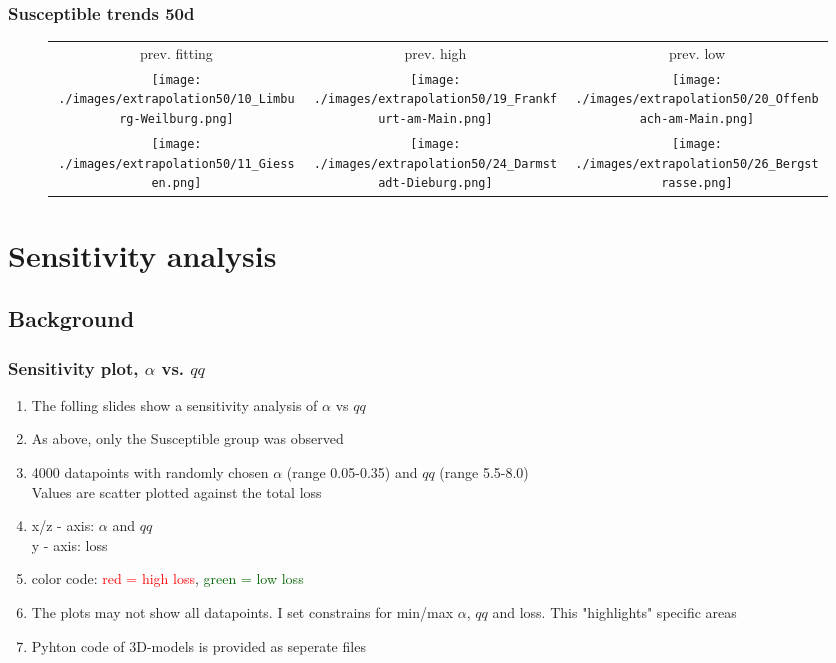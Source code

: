 \documentclass{beamer}
\begin{document}
\begin{frame}
	\frametitle{Susceptible trends 50d}
	\begin{center}
		\begin{figure}
			\begin{adjustwidth}{-0.8cm}{}
			\begin{tabular}{ccc}
				prev. fitting & prev. high & prev. low \\
				\texttt{[image: ./images/extrapolation50/10\_Limburg-Weilburg.png]}
					& \texttt{[image: ./images/extrapolation50/19\_Frankfurt-am-Main.png]}
					& \texttt{[image: ./images/extrapolation50/20\_Offenbach-am-Main.png]} \\
				\texttt{[image: ./images/extrapolation50/11\_Giessen.png]}
					& \texttt{[image: ./images/extrapolation50/24\_Darmstadt-Dieburg.png]}
					& \texttt{[image: ./images/extrapolation50/26\_Bergstrasse.png]}
			\end{tabular}
			\end{adjustwidth}
		\end{figure}
	\end{center}
\end{frame}



\section{Sensitivity analysis}
\subsection{Background}
\begin{frame}
	\frametitle{Sensitivity plot, $\alpha$ vs. $qq$}
	\begin{enumerate}[$\bullet$]
		\item The folling slides show a sensitivity analysis of $\alpha$ vs $qq$
		\item As above, only the Susceptible group was observed
		\item 4000 datapoints with randomly chosen $\alpha$ (range 0.05-0.35) and $qq$ (range 5.5-8.0)\\Values are scatter plotted against the total loss
		\item x/z - axis: $\alpha$ and $qq$\\
			y - axis: loss
		\item color code: \textcolor{red}{red = high loss}, \textcolor{darkgreen}{green = low loss}
		\item The plots may not show all datapoints. I set constrains for min/max $\alpha$, $qq$ and loss.
			This "highlights" specific areas
		\item Pyhton code of 3D-models is provided as seperate files
	\end{enumerate}
\end{frame}
\end{document}
